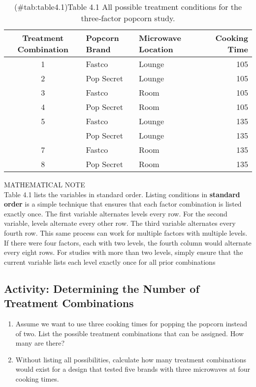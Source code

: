 \documentclass[
]{report}
\providecommand{\tightlist}{%
  \setlength{\itemsep}{0pt}\setlength{\parskip}{0pt}}
\begin{document}
\begin{table}

\caption{(\#tab:table4.1)Table 4.1 All possible treatment conditions for the three‐factor popcorn study.}
\centering
\begin{tabular}[t]{cllr}
\toprule
Treatment Combination & Popcorn Brand & Microwave Location & Cooking Time\\
\midrule
1 & Fastco & Lounge & 105\\
2 & Pop Secret & Lounge & 105\\
3 & Fastco & Room & 105\\
4 & Pop Secret & Room & 105\\
5 & Fastco & Lounge & 135\\
\addlinespace
6 & Pop Secret & Lounge & 135\\
7 & Fastco & Room & 135\\
8 & Pop Secret & Room & 135\\
\bottomrule
\end{tabular}
\end{table}

MATHEMATICAL NOTE\\
Table 4.1 lists the variables in standard order. Listing conditions in \textbf{standard order} is a simple technique
that ensures that each factor combination is listed exactly once. The first variable alternates levels every
row. For the second variable, levels alternate every other row. The third variable alternates every fourth
row. This same process can work for multiple factors with multiple levels. If there were four factors, each
with two levels, the fourth column would alternate every eight rows. For studies with more than two levels,
simply ensure that the current variable lists each level exactly once for all prior combinations

\subsection{Activity: Determining the Number of Treatment Combinations}\label{activity-determining-the-number-of-treatment-combinations}

\begin{enumerate}
\def\labelenumi{\arabic{enumi}.}
\tightlist
\item
  Assume we want to use three cooking times for popping the popcorn instead of two. List the possible
  treatment combinations that can be assigned. How many are there?\\
\item
  Without listing all possibilities, calculate how many treatment combinations would exist for a design
  that tested five brands with three microwaves at four cooking times.
\end{enumerate}
\end{document}
